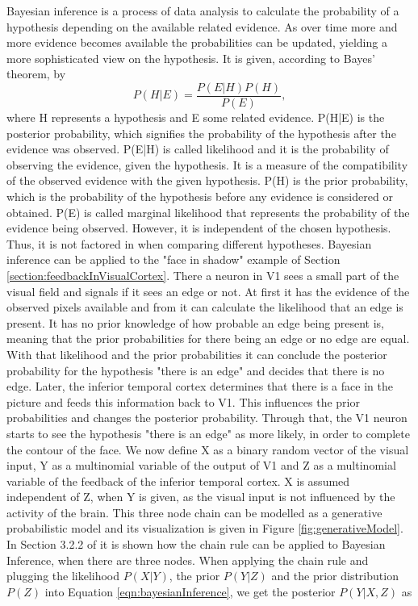 Bayesian inference is a process of data analysis to calculate the probability of a hypothesis depending on the available related evidence. As over time more and more evidence becomes available the probabilities can be updated, yielding a more sophisticated view on the hypothesis. It is given, according to Bayes' theorem, by
\begin{equation}
\label{eqn:bayesianInference}
P(H|E) = \frac{P(E|H)P(H)}{P(E)},
\end{equation}
where H represents a hypothesis and E some related evidence. P(H|E) is the posterior probability, which signifies the probability of the hypothesis after the evidence was observed. P(E|H) is called likelihood and it is the probability of observing the evidence, given the hypothesis. It is a measure of the compatibility of the observed evidence with the given hypothesis. P(H) is the prior probability, which is the probability of the hypothesis before any evidence is considered or obtained. P(E) is called marginal likelihood that represents the probability of the evidence being observed. However, it is independent of the chosen hypothesis. Thus, it is not factored in when comparing different hypotheses.
Bayesian inference can be applied to the "face in shadow" example of Section \ref{section:feedbackInVisualCortex}. There a neuron in V1 sees a small part of the visual field and signals if it sees an edge or not. At first it has the evidence of the observed pixels available and from it can calculate the likelihood that an edge is present. It has no prior knowledge of how probable an edge being present is, meaning that the prior probabilities for there being an edge or no edge are equal. With that likelihood and the prior probabilities it can conclude the posterior probability for the hypothesis "there is an edge" and decides that there is no edge.
Later, the inferior temporal cortex determines that there is a face in the picture and feeds this information back to V1. This influences the prior probabilities and changes the posterior probability. Through that, the V1 neuron starts to see the hypothesis  "there is an edge" as more likely, in order to complete the contour of the face. 
We now define X as a binary random vector of the visual input, Y as a multinomial variable of the output of V1 and Z as a multinomial variable of the feedback of the inferior temporal cortex. X is assumed independent of Z, when Y is given, as the visual input is not influenced by the activity of the brain. This three node chain can be modelled as a generative probabilistic model and its visualization is given in Figure \ref{fig:generativeModel}. In Section 3.2.2 of \citet{bayesInferenceBook} it is shown how the chain rule can be applied to Bayesian Inference, when there are three nodes. When applying the chain rule and plugging the likelihood $P(X|Y)$, the prior $P(Y|Z)$ and the prior distribution $P(Z)$ into Equation \ref{eqn:bayesianInference}, we get the posterior $P(Y|X,Z)$ as

